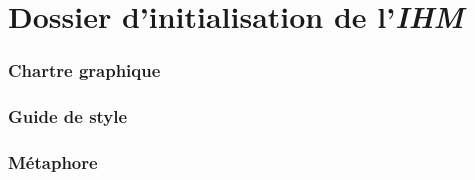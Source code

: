 \newpage
\part{Dossier d'initialisation de l'\textsl{IHM}}
\section{Chartre graphique}

\section{Guide de style}

\section{Métaphore}

